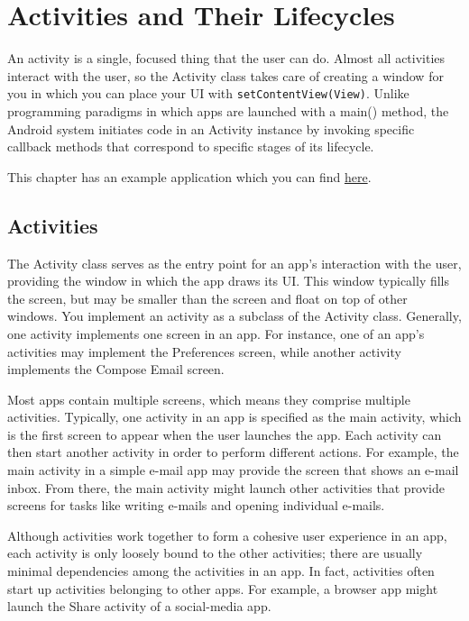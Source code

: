 


\chapter{Activities and Their Lifecycles}




An activity is a single, focused thing that the user can do. Almost all activities interact with the user, so the Activity class takes care of creating a window for you in which you can place your UI with \texttt{setContentView(View)}. Unlike programming paradigms in which apps are launched with a main() method, the Android system initiates code in an Activity instance by invoking specific callback methods that correspond to specific stages of its lifecycle.

\begin{framed}
	This chapter has an example application which you can find \href{https://github.com/eothein/ActivityExample}{here}.
\end{framed}


\section{Activities}
The Activity class serves as the entry point for an app’s interaction with the user, providing the window in which the app draws its UI. This window typically fills the screen, but may be smaller than the screen and float on top of other windows. You implement an activity as a subclass of the Activity class. Generally, one activity implements one screen in an app. For instance, one of an app’s activities may implement the Preferences screen, while another activity implements the Compose Email screen.

Most apps contain multiple screens, which means they comprise multiple activities. Typically, one activity in an app is specified as the main activity, which is the first screen to appear when the user launches the app. Each activity can then start another activity in order to perform different actions. For example, the main activity in a simple e-mail app may provide the screen that shows an e-mail inbox. From there, the main activity might launch other activities that provide screens for tasks like writing e-mails and opening individual e-mails.

Although activities work together to form a cohesive user experience in an app, each activity is only loosely bound to the other activities; there are usually minimal dependencies among the activities in an app. In fact, activities often start up activities belonging to other apps. For example, a browser app might launch the Share activity of a social-media app.

